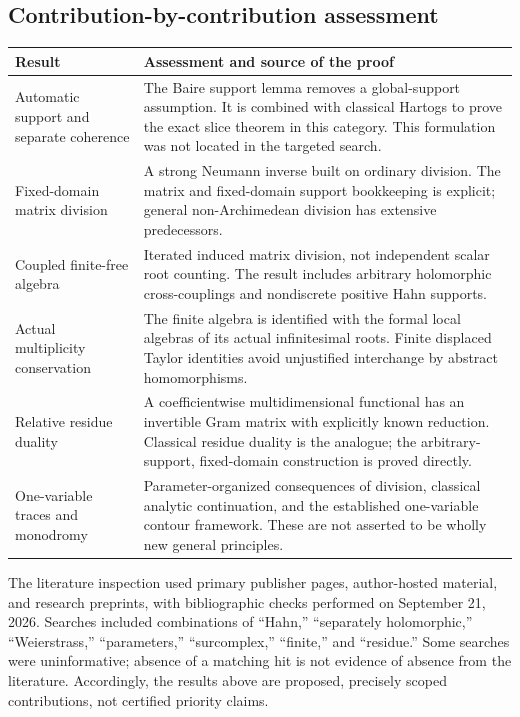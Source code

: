 \documentclass[11pt,oneside]{article}
\numberwithin{equation}{section}
\theoremstyle{definition}
\theoremstyle{remark}\newtheorem{remark}[theorem]{Remark}
\begin{document}
\subsection{Contribution-by-contribution assessment}
\begin{longtable}{@{}L{0.29\textwidth}L{0.62\textwidth}@{}}
\toprule
Result & Assessment and source of the proof\\
\midrule
\endhead
Automatic support and separate coherence & The Baire support lemma removes a global-support assumption. It is combined with classical Hartogs to prove the exact slice theorem in this category. This formulation was not located in the targeted search.\\[0.5em]
Fixed-domain matrix division & A strong Neumann inverse built on ordinary division. The matrix and fixed-domain support bookkeeping is explicit; general non-Archimedean division has extensive predecessors.\\[0.5em]
Coupled finite-free algebra & Iterated induced matrix division, not independent scalar root counting. The result includes arbitrary holomorphic cross-couplings and nondiscrete positive Hahn supports.\\[0.5em]
Actual multiplicity conservation & The finite algebra is identified with the formal local algebras of its actual infinitesimal roots. Finite displaced Taylor identities avoid unjustified interchange by abstract homomorphisms.\\[0.5em]
Relative residue duality & A coefficientwise multidimensional functional has an invertible Gram matrix with explicitly known reduction. Classical residue duality is the analogue; the arbitrary-support, fixed-domain construction is proved directly.\\[0.5em]
One-variable traces and monodromy & Parameter-organized consequences of division, classical analytic continuation, and the established one-variable contour framework. These are not asserted to be wholly new general principles.\\
\bottomrule
\end{longtable}

The literature inspection used primary publisher pages, author-hosted material, and research preprints, with bibliographic checks performed on September 21, 2026. Searches included combinations of ``Hahn,'' ``separately holomorphic,'' ``Weierstrass,'' ``parameters,'' ``surcomplex,'' ``finite,'' and ``residue.'' Some searches were uninformative; absence of a matching hit is not evidence of absence from the literature. Accordingly, the results above are proposed, precisely scoped contributions, not certified priority claims.
\end{document}
